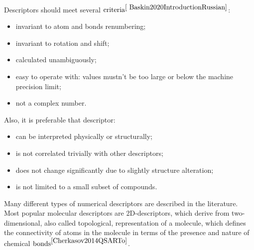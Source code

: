 \noindent Descriptors should meet several $\text{criteria}^{\cite{
Baskin2020IntroductionRussian}}$:
\begin{itemize}
    \item invariant to atom and bonds renumbering;
    \item invariant to rotation and shift;
    \item calculated unambiguously;
    \item easy to operate with: values mustn't be too large or below the machine precision limit;
    \item not a complex number.
\end{itemize}
\hfill\break
Also, it is preferable that descriptor:
\begin{itemize}
    \item can be interpreted physically or structurally;
    \item is not correlated trivially with other descriptors;
    \item does not change significantly due to slightly structure alteration;
    \item is not limited to a small subset of compounds.
\end{itemize}

\noindent Many different types of numerical descriptors are described in the literature. 
Most popular molecular descriptors are 2D-descriptors, which derive from two-dimensional, 
also called topological, representation of a molecule, which defines the connectivity 
of atoms in the molecule in terms of the presence and nature of chemical $\text{bonds}^{\cite{Cherkasov2014QSARTo}}$. 



